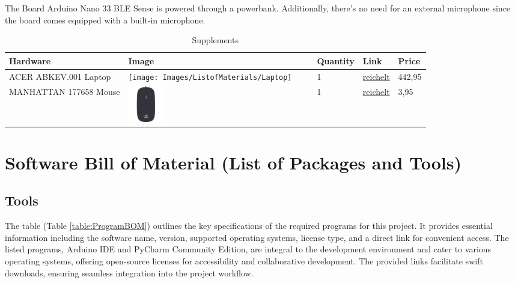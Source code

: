 The Board Arduino Nano 33 BLE Sense is powered through a powerbank. Additionally, there's no need for an external microphone since the board comes equipped with a built-in microphone.



\begin{table}[H]
	
	\begin{tabular}{m{3.0cm}|m{3.0cm}|m{1.7cm}|m{2.3cm}|m{1.5cm}}
		
		\hline
		
		\textbf{Hardware} & \textbf{Image} & \textbf{Quantity} & \textbf{Link} & \textbf{Price}\\
		
		\hline
		
		ACER ABKEV.001 Laptop & \texttt{[image: Images/ListofMaterials/Laptop]} & 1 & \href{https://www.reichelt.de/laptop-notebook-aspire-5-a515-45-r60r-windows-11-home-acer-abkev-001-p342777.html}{reichelt}  &  442{,}95 \texteuro \\
		
		\hline
		
		MANHATTAN 177658 Mouse & \includegraphics[width=0.2\textwidth]{Images/ListofMaterials/Mouse} & 1 & \href{https://www.reichelt.de/maus-mouse-kabel-usb-3-tasten-schwarz-manhattan-177658-p306883.html}{reichelt} & 3{,}95 \texteuro \\
		
	\end{tabular}
	
	\caption {Supplements}
	\label{table:OptionalHardwareBOM}
	
\end{table}


\section{Software Bill of Material (List of Packages and Tools)}

\subsection{Tools}

The table (Table \ref{table:ProgramBOM}) outlines the key specifications of the required programs for this project. It provides essential information including the software name, version, supported operating systems, license type, and a direct link for convenient access. The listed programs, Arduino IDE and PyCharm Community Edition, are integral to the development environment and cater to various operating systems, offering open-source licenses for accessibility and collaborative development. The provided links facilitate swift downloads, ensuring seamless integration into the project workflow.

